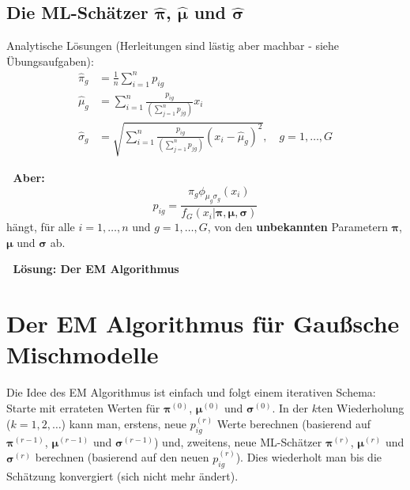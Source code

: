 \documentclass[
]{book}
\begin{document}
\hypertarget{die-ml-schuxe4tzer-hatboldsymbolpi-hatboldsymbolmu-und-hatboldsymbolsigma}{%
\subsection*{\texorpdfstring{Die ML-Schätzer \(\hat{\boldsymbol{\pi}}\), \(\hat{\boldsymbol{\mu}}\) und \(\hat{\boldsymbol{\sigma}}\)}{Die ML-Schätzer \textbackslash hat\{\textbackslash boldsymbol\{\textbackslash pi\}\}, \textbackslash hat\{\textbackslash boldsymbol\{\textbackslash mu\}\} und \textbackslash hat\{\textbackslash boldsymbol\{\textbackslash sigma\}\}}}\label{die-ml-schuxe4tzer-hatboldsymbolpi-hatboldsymbolmu-und-hatboldsymbolsigma}}

Analytische Lösungen (Herleitungen sind lästig aber machbar - siehe Übungsaufgaben):
\[
\begin{align*}
\hat\pi_g&=\frac{1}{n}\sum_{i=1}^np_{ig}\\
\hat\mu_g&=\sum_{i=1}^n\frac{p_{ig}}{\left(\sum_{j=1}^np_{jg}\right)}x_i\\
\hat\sigma_g&=\sqrt{\sum_{i=1}^n\frac{p_{ig}}{\left(\sum_{j=1}^np_{jg}\right)}\left(x_i-\hat\mu_g\right)^2},\quad g=1,\dots,G
\end{align*}
\]

🙈 {\textbf{Aber:}}
\[
p_{ig}=\frac{\pi_g\phi_{\mu_g\sigma_g}(x_i)}{f_G(x_i|\boldsymbol{\pi},\boldsymbol{\mu},\boldsymbol{\sigma})}
\]
hängt, für alle \(i=1,\dots,n\) und \(g=1,\dots,G\), von den {\textbf{unbekannten}} Parametern \(\boldsymbol{\pi}\), \(\boldsymbol{\mu}\) und \(\boldsymbol{\sigma}\) ab.

🥳 {\textbf{Lösung: Der EM Algorithmus}}

\hypertarget{der-em-algorithmus-fuxfcr-gauuxdfsche-mischmodelle}{%
\section{Der EM Algorithmus für Gaußsche Mischmodelle}\label{der-em-algorithmus-fuxfcr-gauuxdfsche-mischmodelle}}

Die Idee des EM Algorithmus ist einfach und folgt einem iterativen Schema: Starte mit errateten Werten für \(\boldsymbol{\pi}^{(0)}\), \(\boldsymbol{\mu}^{(0)}\) und \(\boldsymbol{\sigma}^{(0)}\). In der \(k\)ten Wiederholung (\(k=1,2,\dots\)) kann man, erstens, neue \(p_{ig}^{(r)}\) Werte berechnen (basierend auf \(\boldsymbol{\pi}^{(r-1)}\), \(\boldsymbol{\mu}^{(r-1)}\) und \(\boldsymbol{\sigma}^{(r-1)}\)) und, zweitens, neue ML-Schätzer \(\boldsymbol{\pi}^{(r)}\), \(\boldsymbol{\mu}^{(r)}\) und \(\boldsymbol{\sigma}^{(r)}\) berechnen (basierend auf den neuen \(p_{ig}^{(r)}\)). Dies wiederholt man bis die Schätzung konvergiert (sich nicht mehr ändert).
\end{document}
